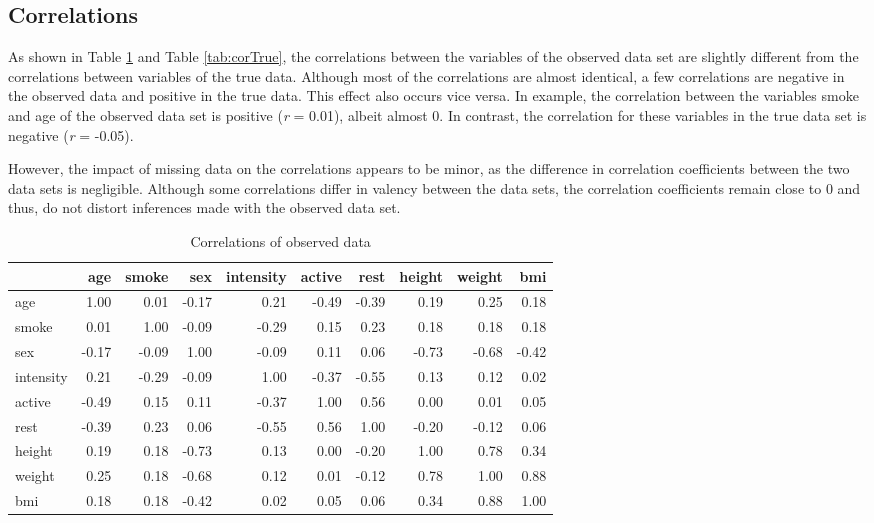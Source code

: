 \documentclass[
]{article}
\begin{document}
\hypertarget{data3}{%
\subsection{Correlations}\label{data3}}

As shown in Table \ref{tab:corObs} and Table \ref{tab:corTrue}, the correlations between the variables of the observed data set are slightly different from the correlations between variables of the true data. Although most of the correlations are almost identical, a few correlations are negative in the observed data and positive in the true data. This effect also occurs vice versa. In example, the correlation between the variables smoke and age of the observed data set is positive (\emph{r} = 0.01), albeit almost 0. In contrast, the correlation for these variables in the true data set is negative (\emph{r} = -0.05).

However, the impact of missing data on the correlations appears to be minor, as the difference in correlation coefficients between the two data sets is negligible. Although some correlations differ in valency between the data sets, the correlation coefficients remain close to 0 and thus, do not distort inferences made with the observed data set.

\begin{table}

\caption{\label{tab:corObs}Correlations of observed data}
\centering
\begin{tabular}[t]{l|r|r|r|r|r|r|r|r|r}
\hline
  & age & smoke & sex & intensity & active & rest & height & weight & bmi\\
\hline
age & 1.00 & 0.01 & -0.17 & 0.21 & -0.49 & -0.39 & 0.19 & 0.25 & 0.18\\
\hline
smoke & 0.01 & 1.00 & -0.09 & -0.29 & 0.15 & 0.23 & 0.18 & 0.18 & 0.18\\
\hline
sex & -0.17 & -0.09 & 1.00 & -0.09 & 0.11 & 0.06 & -0.73 & -0.68 & -0.42\\
\hline
intensity & 0.21 & -0.29 & -0.09 & 1.00 & -0.37 & -0.55 & 0.13 & 0.12 & 0.02\\
\hline
active & -0.49 & 0.15 & 0.11 & -0.37 & 1.00 & 0.56 & 0.00 & 0.01 & 0.05\\
\hline
rest & -0.39 & 0.23 & 0.06 & -0.55 & 0.56 & 1.00 & -0.20 & -0.12 & 0.06\\
\hline
height & 0.19 & 0.18 & -0.73 & 0.13 & 0.00 & -0.20 & 1.00 & 0.78 & 0.34\\
\hline
weight & 0.25 & 0.18 & -0.68 & 0.12 & 0.01 & -0.12 & 0.78 & 1.00 & 0.88\\
\hline
bmi & 0.18 & 0.18 & -0.42 & 0.02 & 0.05 & 0.06 & 0.34 & 0.88 & 1.00\\
\hline
\end{tabular}
\end{table}
\end{document}
